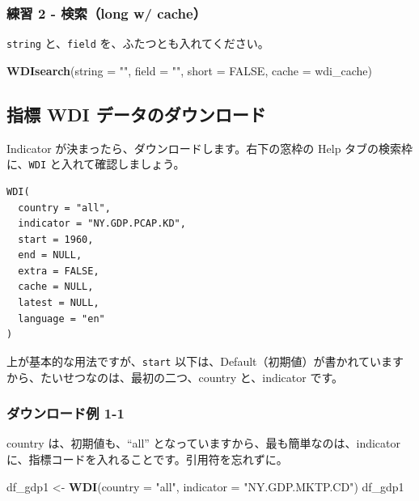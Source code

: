 \documentclass[
  xelatex, ja=standard]{bxjsbook}
\newenvironment{Shaded}{\begin{snugshade}}{\end{snugshade}}
\newcommand{\AttributeTok}[1]{\textcolor[rgb]{0.13,0.29,0.53}{#1}}
\newcommand{\ConstantTok}[1]{\textcolor[rgb]{0.56,0.35,0.01}{#1}}
\newcommand{\FunctionTok}[1]{\textcolor[rgb]{0.13,0.29,0.53}{\textbf{#1}}}
\newcommand{\NormalTok}[1]{#1}
\newcommand{\OtherTok}[1]{\textcolor[rgb]{0.56,0.35,0.01}{#1}}
\newcommand{\StringTok}[1]{\textcolor[rgb]{0.31,0.60,0.02}{#1}}
\theoremstyle{definition}
\theoremstyle{definition}
\theoremstyle{definition}
\theoremstyle{definition}
\theoremstyle{remark}
\begin{document}
\hypertarget{ux7df4ux7fd2-2---ux691cux7d22long-w-cache}{%
\subsubsection{練習 2 - 検索（long w/ cache）}\label{ux7df4ux7fd2-2---ux691cux7d22long-w-cache}}

\texttt{string} と、\texttt{field} を、ふたつとも入れてください。

\begin{Shaded}
\begin{Highlighting}[]
\FunctionTok{WDIsearch}\NormalTok{(}\AttributeTok{string =} \StringTok{""}\NormalTok{, }\AttributeTok{field =} \StringTok{""}\NormalTok{, }\AttributeTok{short =} \ConstantTok{FALSE}\NormalTok{, }\AttributeTok{cache =}\NormalTok{ wdi\_cache)}
\end{Highlighting}
\end{Shaded}

\hypertarget{ux6307ux6a19-wdi-ux30c7ux30fcux30bfux306eux30c0ux30a6ux30f3ux30edux30fcux30c9}{%
\subsection{指標 WDI データのダウンロード}\label{ux6307ux6a19-wdi-ux30c7ux30fcux30bfux306eux30c0ux30a6ux30f3ux30edux30fcux30c9}}

Indicator が決まったら、ダウンロードします。右下の窓枠の Help タブの検索枠に、\texttt{WDI} と入れて確認しましょう。

\begin{verbatim}
WDI(
  country = "all",
  indicator = "NY.GDP.PCAP.KD",
  start = 1960,
  end = NULL,
  extra = FALSE,
  cache = NULL,
  latest = NULL,
  language = "en"
)
\end{verbatim}

上が基本的な用法ですが、\texttt{start} 以下は、Default（初期値）が書かれていますから、たいせつなのは、最初の二つ、country と、indicator です。

\hypertarget{ux30c0ux30a6ux30f3ux30edux30fcux30c9ux4f8b-1-1}{%
\subsubsection{ダウンロード例 1-1}\label{ux30c0ux30a6ux30f3ux30edux30fcux30c9ux4f8b-1-1}}

country は、初期値も、``all'' となっていますから、最も簡単なのは、indicator に、指標コードを入れることです。引用符を忘れずに。

\begin{Shaded}
\begin{Highlighting}[]
\NormalTok{df\_gdp1 }\OtherTok{\textless{}{-}} \FunctionTok{WDI}\NormalTok{(}\AttributeTok{country =} \StringTok{"all"}\NormalTok{, }\AttributeTok{indicator =} \StringTok{"NY.GDP.MKTP.CD"}\NormalTok{)}
\NormalTok{df\_gdp1}
\end{Highlighting}
\end{Shaded}
\end{document}
